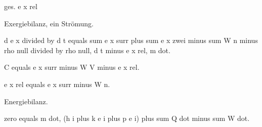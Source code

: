 ges. e x rel

Exergiebilanz, ein Strömung.

d e x divided by d t equals sum e x surr plus sum e x zwei minus sum W n minus rho null divided by rho null, d t minus e x rel, m dot.

C equals e x surr minus W V minus e x rel.

e x rel equals e x surr minus W n.

Energiebilanz.

zero equals m dot, (h i plus k e i plus p e i) plus sum Q dot minus sum W dot.